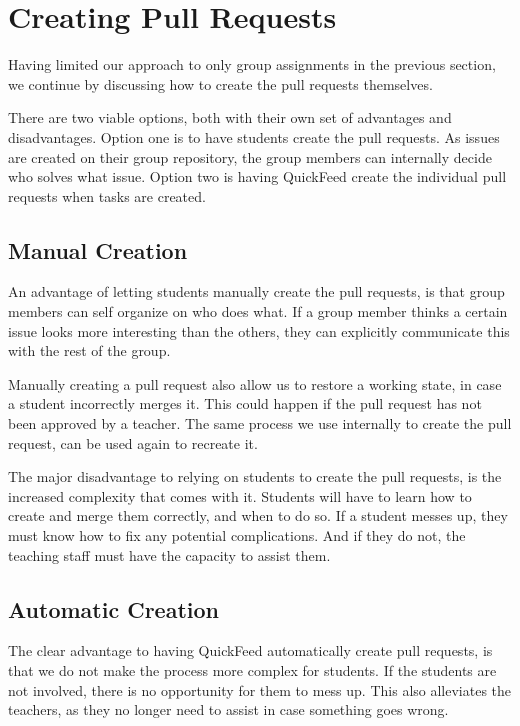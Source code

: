 \section{Creating Pull Requests}
\label{sec:creating-pull-requests}

Having limited our approach to only group assignments in the previous section, we continue by discussing how to create the pull requests themselves.

There are two viable options, both with their own set of advantages and disadvantages.
Option one is to have students create the pull requests.
As issues are created on their group repository, the group members can internally decide who solves what issue.
Option two is having QuickFeed create the individual pull requests when tasks are created.

\subsection{Manual Creation}

An advantage of letting students manually create the pull requests, is that group members can self organize on who does what.
If a group member thinks a certain issue looks more interesting than the others, they can explicitly communicate this with the rest of the group.

Manually creating a pull request also allow us to restore a working state, in case a student incorrectly merges it.
This could happen if the pull request has not been approved by a teacher.
The same process we use internally to create the pull request, can be used again to recreate it.

The major disadvantage to relying on students to create the pull requests, is the increased complexity that comes with it.
Students will have to learn how to create and merge them correctly, and when to do so.
If a student messes up, they must know how to fix any potential complications.
And if they do not, the teaching staff must have the capacity to assist them.

\subsection{Automatic Creation}

The clear advantage to having QuickFeed automatically create pull requests, is that we do not make the process more complex for students.
If the students are not involved, there is no opportunity for them to mess up.
This also alleviates the teachers, as they no longer need to assist in case something goes wrong.

